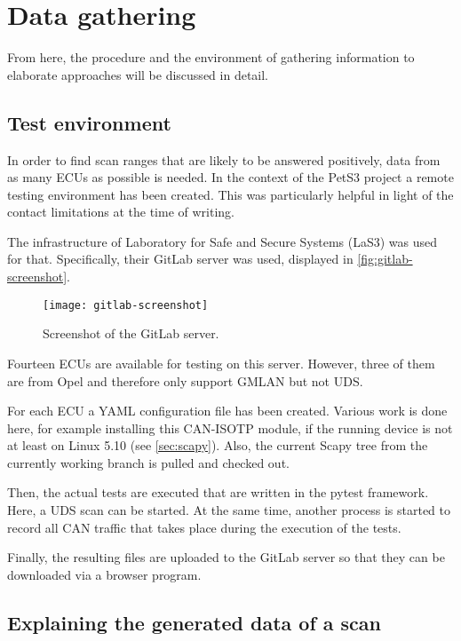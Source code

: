 \section{Data gathering}
\label{sec:data-gathering}

From here, the procedure and the environment of gathering information to elaborate approaches will be discussed in detail.

\subsection{Test environment}

In order to find scan ranges that are likely to be answered positively, data from as many ECUs as possible is needed. In the context of the PetS3 project a remote testing environment has been created. This was particularly helpful in light of the contact limitations at the time of writing.

The infrastructure of Laboratory for Safe and Secure Systems (LaS3) was used for that. Specifically, their GitLab server was used, displayed in \autoref{fig:gitlab-screenshot}.

\begin{figure}[h]
    \centering
    \texttt{[image: gitlab-screenshot]}
    \caption{Screenshot of the GitLab server.}
    \label{fig:gitlab-screenshot}
\end{figure}

Fourteen ECUs are available for testing on this server. However, three of them are from Opel and therefore only support GMLAN but not UDS.

For each ECU a YAML configuration file has been created. Various work is done here, for example installing this CAN-ISOTP module, if the running device is not at least on Linux 5.10 (see \autoref{sec:scapy}). Also, the current Scapy tree from the currently working branch is pulled and checked out.

Then, the actual tests are executed that are written in the pytest framework. Here, a UDS scan can be started. At the same time, another process is started to record all CAN traffic that takes place during the execution of the tests.

Finally, the resulting files are uploaded to the GitLab server so that they can be downloaded via a browser program.

\subsection{Explaining the generated data of a scan}

